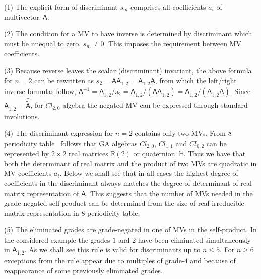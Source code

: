 \documentclass{birkjour}
\newcommand{\cl}[2]{\ensuremath{\mathit{Cl}_{#1,#2}}} %
\newcommand{\cliffordconjugate}[1]{\wideparen{\widetilde{#1}}}
\def\m#1{\mathsf{#1}} %
\begin{document}
 (1) The explicit form of discriminant $s_m$ comprises all coefficients $a_i$ of multivector~$\m{A}$.

 (2) The condition for a MV to have inverse is determined by
 discriminant which must be unequal to zero, $s_m\ne 0$. This imposes
 the requirement between MV coefficients.

(3) Because reverse leaves the scalar (discriminant) invariant,
the above formula for $n=2$ can be rewritten as
$s_2=\m{A} \m{A}_{\bar 1,\bar 2}=\m{A}_{\bar 1,\bar 2}\m{A}$, from
which the left/right inverse formulas follow,
$\m{A}^{-1}=\m{A}_{\bar 1,\bar 2}/s_2= \m{A}_{\bar 1,\bar
2}/(\m{A}\m{A}_{\bar 1,\bar 2})=\m{A}_{\bar 1,\bar 2}/(\m{A}_{\bar
1,\bar 2}\m{A})$. Since  $\m{A}_{\bar 1,\bar
2}=\cliffordconjugate{\m{A}}$, for \cl{2}{0} algebra the
negated MV can be expressed through standard involutions.

 (4) The discriminant expression for $n=2$ contains only two MVs.
 From 8-periodicity table~\cite{Lounesto97} follows that GA
 algebras \cl{2}{0}, \cl{1}{1} and \cl{0}{2}
 can be represented  by  $2\times2$ real matrices $\mathbb{R}(2)$ or quaternion~$\mathbb{H}$.
 Thus we have that both the determinant of real matrix and the product of two MVs are
 quadratic in MV coefficients $a_i$. Below we shall see that in all cases the highest degree  of coefficients in the discriminant
 always matches the degree of determinant of real matrix representation of $\m{A}$.
 This suggests that the number of MVs needed in the grade-negated self-product can be determined
 from the size of real irreducible matrix representation in 8-periodicity table.


 (5) The eliminated grades are grade-negated in one of MVs in the self-product.
 In the considered  example the grades $1$ and $2$ have been eliminated simultaneously
 in  $\m{A}_{\bar 1,\bar 2}$. As we shall see this rule is valid for discriminants
 up to $n\le5$.
 For $n\ge6$ exceptions from the rule appear due to multiples of grade-$4$ and
 because of reappearance of some previously eliminated grades.
\end{document}
